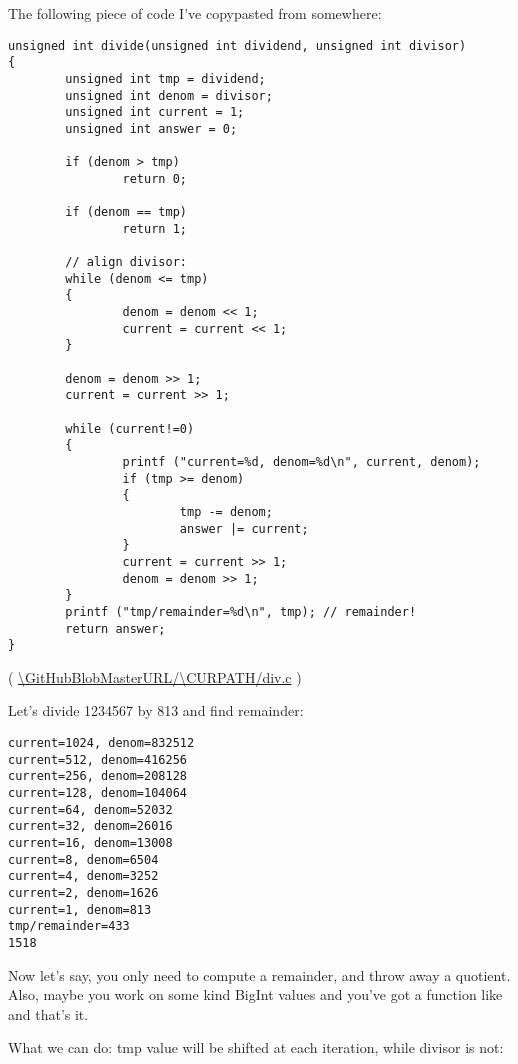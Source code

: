 The following piece of code I've copypasted from somewhere:

\begin{lstlisting}[style=customc]
unsigned int divide(unsigned int dividend, unsigned int divisor)
{
        unsigned int tmp = dividend;
        unsigned int denom = divisor;
        unsigned int current = 1;
        unsigned int answer = 0;

        if (denom > tmp)
                return 0;

        if (denom == tmp)
                return 1;

        // align divisor:
        while (denom <= tmp)
        {
                denom = denom << 1;
                current = current << 1;
        }

        denom = denom >> 1;
        current = current >> 1;

        while (current!=0)
        {
                printf ("current=%d, denom=%d\n", current, denom);
                if (tmp >= denom)
                {
                        tmp -= denom;
                        answer |= current;
                }
                current = current >> 1;
                denom = denom >> 1;
        }
        printf ("tmp/remainder=%d\n", tmp); // remainder!
        return answer;
}
\end{lstlisting}

( \url{\GitHubBlobMasterURL/\CURPATH/div.c} )

Let's divide 1234567 by 813 and find remainder:

\begin{lstlisting}
current=1024, denom=832512
current=512, denom=416256
current=256, denom=208128
current=128, denom=104064
current=64, denom=52032
current=32, denom=26016
current=16, denom=13008
current=8, denom=6504
current=4, denom=3252
current=2, denom=1626
current=1, denom=813
tmp/remainder=433
1518
\end{lstlisting}


Now let's say, you only need to compute a remainder, and throw away a quotient.
Also, maybe you work on some kind BigInt values and you've got a function like  and that's it.

What we can do: tmp value will be shifted at each iteration, while divisor is not:

